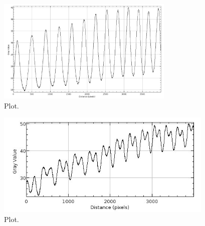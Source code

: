 \begin{figure}[h!]
  \centering
  \includegraphics[height=5cm]{pics/Plot_480nm_B=0_P=0.jpg}
  \caption{Plot.}
  \label{fig:p3}
\end{figure}
\begin{figure}[h!]
  \centering
  \includegraphics[height=5cm]{pics/Plot_480nm_I=5.5_P=0.jpg}
  \caption{Plot.}
  \label{fig:p4}
\end{figure}

